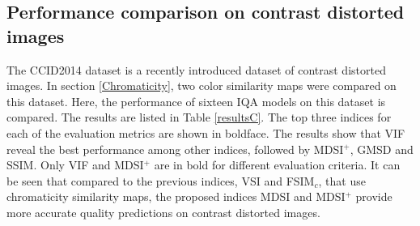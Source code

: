 \subsection{Performance comparison on contrast distorted images}
\label{Contrast} 

The CCID2014 dataset \cite{CCID2014} is a recently introduced dataset of contrast distorted images. In section \ref{Chromaticity}, two color similarity maps were compared on this dataset. Here, the performance of sixteen IQA models on this dataset is compared. The results are listed in Table \ref{resultsC}. The top three indices for each of the evaluation metrics are shown in boldface. The results show that VIF reveal the best performance among other indices, followed by MDSI$^+$, GMSD and SSIM. Only VIF and MDSI$^+$ are in bold for different evaluation criteria. It can be seen that compared to the previous indices, VSI and FSIM$_c$, that use chromaticity similarity maps, the proposed indices MDSI and MDSI$^+$ provide more accurate quality predictions on contrast distorted images.           



